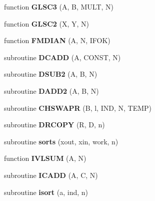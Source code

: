\begin{CompactItemize}
\item 
\hypertarget{mat1_8F_8262975a35ce3c9d1cdab008741a1933}{
function \textbf{GLSC3} (A, B, MULT, N)}
\label{mat1_8F_8262975a35ce3c9d1cdab008741a1933}

\item 
\hypertarget{mat1_8F_45b385c3cdba2d51c8793cd3b410883c}{
function \textbf{GLSC2} (X, Y, N)}
\label{mat1_8F_45b385c3cdba2d51c8793cd3b410883c}

\item 
\hypertarget{mat1_8F_08e1eac7d5e8158625a9615f6589c8ec}{
function \textbf{FMDIAN} (A, N, IFOK)}
\label{mat1_8F_08e1eac7d5e8158625a9615f6589c8ec}

\item 
\hypertarget{mat1_8F_cc94f9d48dfcff19e3eb11cd4c00a1c1}{
subroutine \textbf{DCADD} (A, CONST, N)}
\label{mat1_8F_cc94f9d48dfcff19e3eb11cd4c00a1c1}

\item 
\hypertarget{mat1_8F_4e3cbb94eb7e46f2dea61b2c5f1bc8bf}{
subroutine \textbf{DSUB2} (A, B, N)}
\label{mat1_8F_4e3cbb94eb7e46f2dea61b2c5f1bc8bf}

\item 
\hypertarget{mat1_8F_f9cc7d97301184837944b8bef1b76e34}{
subroutine \textbf{DADD2} (A, B, N)}
\label{mat1_8F_f9cc7d97301184837944b8bef1b76e34}

\item 
\hypertarget{mat1_8F_35640f8ff90572493b826a4bff7b105c}{
subroutine \textbf{CHSWAPR} (B, l, IND, N, TEMP)}
\label{mat1_8F_35640f8ff90572493b826a4bff7b105c}

\item 
\hypertarget{mat1_8F_0da07c52de871ba30c643195615d6859}{
subroutine \textbf{DRCOPY} (R, D, n)}
\label{mat1_8F_0da07c52de871ba30c643195615d6859}

\item 
\hypertarget{mat1_8F_4980248dc5e56aca2716e55ef13181db}{
subroutine \textbf{sorts} (xout, xin, work, n)}
\label{mat1_8F_4980248dc5e56aca2716e55ef13181db}

\item 
\hypertarget{mat1_8F_9515a9b5dc598f19aef46fbcc4a69410}{
function \textbf{IVLSUM} (A, N)}
\label{mat1_8F_9515a9b5dc598f19aef46fbcc4a69410}

\item 
\hypertarget{mat1_8F_e401e94edfd4bd22a07eb435c57ff559}{
subroutine \textbf{ICADD} (A, C, N)}
\label{mat1_8F_e401e94edfd4bd22a07eb435c57ff559}

\item 
\hypertarget{mat1_8F_2add00098b77e54191b10eb6711193f6}{
subroutine \textbf{isort} (a, ind, n)}
\label{mat1_8F_2add00098b77e54191b10eb6711193f6}


\end{CompactItemize}
